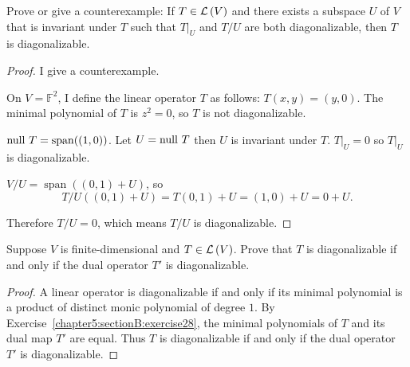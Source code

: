 \begin{exercise}
    Prove or give a counterexample: If $T \in \mathcal{L}\left({V}\right)$ and there exists a subspace $U$ of $V$ that is invariant under $T$ such that $T\vert_{U}$ and $T/U$ are both diagonalizable, then $T$ is diagonalizable.
\end{exercise}

\begin{proof}
    I give a counterexample.

    On $V = \mathbb{F}^{2}$, I define the linear operator $T$ as follows: $T(x, y) = (y, 0)$. The minimal polynomial of $T$ is $z^{2} = 0$, so $T$ is not diagonalizable.

    $\operatorname{null}\,{T} = \operatorname{span}((1, 0))$. Let $U = \operatorname{null}\,{T}$ then $U$ is invariant under $T$. $T\vert_{U} = 0$ so $T\vert_{U}$ is diagonalizable.

    $V/U = \operatorname{span}((0, 1) + U)$, so
    \[
        T/U((0, 1) + U) = T(0, 1) + U = (1, 0) + U = 0 + U.
    \]

    Therefore $T/U = 0$, which means $T/U$ is diagonalizable.
\end{proof}
\newpage

\begin{exercise}
    Suppose $V$ is finite-dimensional and $T \in \mathcal{L}\left({V}\right)$. Prove that $T$ is diagonalizable if and only if the dual operator $T'$ is diagonalizable.
\end{exercise}

\begin{proof}
    A linear operator is diagonalizable if and only if its minimal polynomial is a product of distinct monic polynomial of degree $1$. By Exercise~\ref{chapter5:sectionB:exercise28}, the minimal polynomials of $T$ and its dual map $T'$ are equal. Thus $T$ is diagonalizable if and only if the dual operator $T'$ is diagonalizable.
\end{proof}
\newpage

